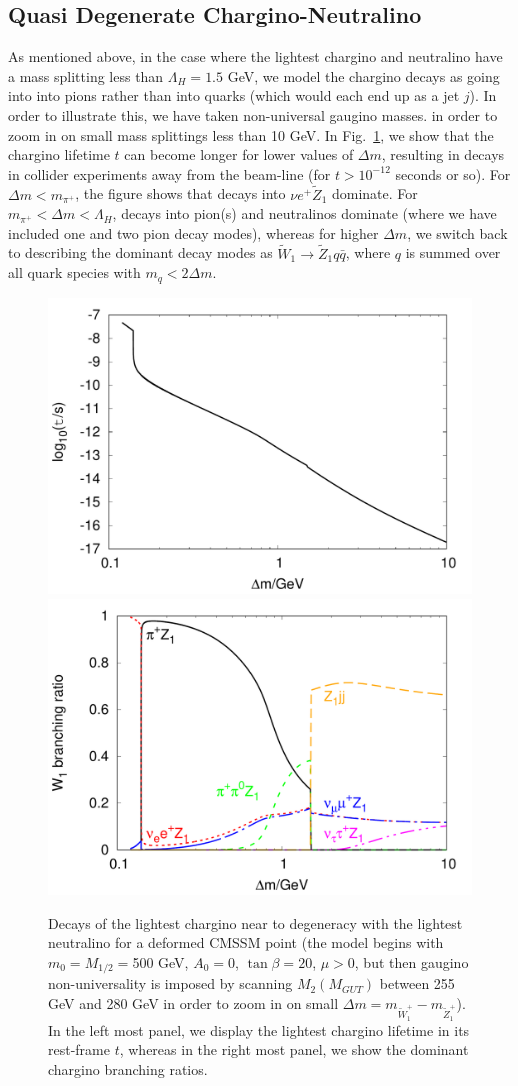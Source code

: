 \documentclass[final,3p,times]{elsarticle}
\begin{document}
\subsection{Quasi Degenerate Chargino-Neutralino} \label{quasi}
As mentioned above, in 
the case where the lightest chargino and neutralino have a mass splitting
 less
than $\Lambda_H=1.5$ GeV, we model the chargino decays as going into 
into pions rather than into quarks (which would each end up as a jet $j$). In
order to 
illustrate this, we have taken non-universal gaugino masses.  in order to zoom
in on small mass splittings less than 10 GeV. In Fig.~\ref{fig:chdk}, we show
that the chargino lifetime $t$ can become longer for lower values of
$\Delta m$, resulting in decays in collider experiments away from the
beam-line (for $t> 10^{-12}$ seconds or so). For $\Delta m<m_{\pi^+}$, the
figure shows that decays into $\nu e^+ {\tilde Z}_1$ dominate. For $m_{\pi^+}
< \Delta m < \Lambda_H$, decays into pion(s) and neutralinos dominate (where
we have included one and two pion decay modes), whereas for higher $\Delta m$,
we switch back to describing the dominant decay modes as ${\tilde W}_1
\rightarrow {\tilde Z}_1 q \bar q$, where $q$ is summed over all quark species
with $m_q < 2 \Delta m$.
\begin{figure}
\includegraphics[width=0.5 \textwidth]{anc/chiLifetime}
\includegraphics[width=0.5 \textwidth]{anc/chiDK}
\caption{Decays of the lightest chargino near to degeneracy with the lightest
  neutralino for a deformed CMSSM point (the model begins with $m_0=M_{1/2}=$500
  GeV, 
$A_0=0$, $\tan \beta=20$, $\mu>0$, but then gaugino non-universality is
imposed by scanning $M_2(M_{GUT})$ between 255 GeV and 280 GeV in order to
zoom in on small $\Delta m=m_{{\tilde W}_1^+} - m_{{\tilde 
    Z}_1^+}$). In the left most panel, we display the lightest chargino
lifetime in its rest-frame $t$, whereas in the right most panel, we show the
dominant chargino branching ratios.\label{fig:chdk}}
\end{figure}
\end{document}
